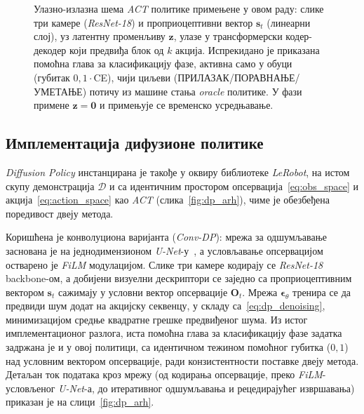 \documentclass[12pt, a4paper]{article}
\begin{document}
\begin{figure}[htbp]
{%
    }
    \caption[Улазно-излазна шема \textit{ACT} политике]{Улазно-излазна шема \textit{ACT} политике примењене у овом раду: слике три камере (\textit{ResNet-18}) и проприоцептивни вектор $\mathbf{s}_t$ (линеарни слој), уз латентну променљиву $\mathbf{z}$, улазе у трансформерски кодер-декодер који предвиђа блок од $k$ акција. Испрекидано је приказана помоћна глава за класификацију фазе, активна само у обуци (губитак $0{,}1\cdot$CE), чији циљеви (ПРИЛАЗАК/ПОРАВНАЊЕ/УМЕТАЊЕ) потичу из машине стања \textit{oracle} политике. У фази примене $\mathbf{z}=\mathbf{0}$ и примењује се временско усредњавање.}
    \label{fig:act_io}
\end{figure}

\subsection{Имплементација дифузионе политике}
\label{subsec:dp_impl}

\textit{Diffusion Policy} инстанцирана је такође у оквиру библиотеке \textit{LeRobot}, на истом скупу демонстрација $\mathcal{D}$ и са идентичним простором опсервација~\eqref{eq:obs_space} и акција~\eqref{eq:action_space} као \textit{ACT} (слика~\ref{fig:dp_arh}), чиме је обезбеђена поредивост двеју метода.

Коришћена је конволуциона варијанта (\textit{Conv-DP}): мрежа за одшумљавање заснована је на једнодимензионом \textit{U-Net}-у~\cite{ronneberger2015unet}, а условљавање опсервацијом остварено је \textit{FiLM} модулацијом.
Слике три камере кодирају се \textit{ResNet-18} backbone-ом, а добијени визуелни дескриптори се заједно са проприоцептивним вектором $\mathbf{s}_t$ сажимају у условни вектор опсервације $\mathbf{O}_t$.
Мрежа $\boldsymbol{\epsilon}_\theta$ тренира се да предвиди шум додат на акцијску секвенцу, у складу са~\eqref{eq:dp_denoising}, минимизацијом средње квадратне грешке предвиђеног шума.
Из истог имплементационог разлога, иста помоћна глава за класификацију фазе задатка задржана је и у овој политици, са идентичном тежином помоћног губитка ($0{,}1$) над условним вектором опсервације, ради конзистентности поставке двеју метода.
Детаљан ток података кроз мрежу (од кодирања опсервације, преко \textit{FiLM}-условљеног \textit{U-Net}-а, до итеративног одшумљавања и рецедирајућег извршавања) приказан је на слици~\ref{fig:dp_arh}.
\end{document}
